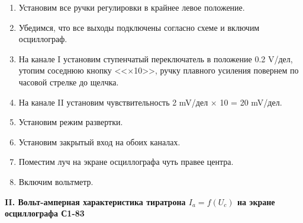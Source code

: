 \documentclass[12pt,a4paper]{article}
\begin{document}
	\begin{enumerate}
		\item Установим все ручки регулировки в крайнее левое положение.
		
		\item Убедимся, что все выходы подключены согласно схеме и включим осциллограф.
		
		\item На канале I установим ступенчатый переключатель в положение 0.2 V/дел, утопим соседнюю кнопку <<$\times$10>>, ручку плавного усиления повернем по часовой стрелке до щелчка.
		
		\item На канале II установим чувствительность 2 mV/дел $\times$ 10 = 20 mV/дел.
		
		\item Установим режим развертки.
		
		\item Установим закрытый вход на обоих каналах.
		
		\item Поместим луч на экране осциллографа чуть правее центра.
		
		\item Включим вольтметр.
	\end{enumerate}

	\begin{center}
		\textbf{II. Вольт-амперная характеристика тиратрона $I_a = f(U_c)$ на экране осциллографа С1-83}
	\end{center}
\end{document}
